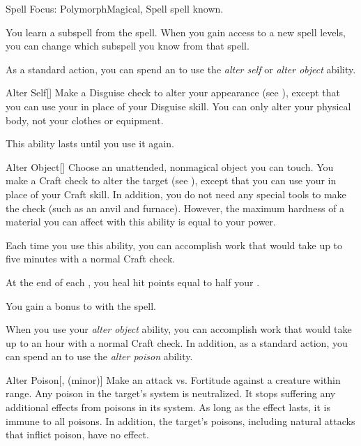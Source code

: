     \begin{feat}{Spell Focus: Polymorph}{Magical, Spell}
        \featpre {} spell known.

         You learn a subspell from the  spell.
        When you gain access to a new spell levels, you can change which subspell you know from that spell.

         As a standard action, you can spend an  to use the \textit{alter self} or \textit{alter object} ability.
        \begin{ability}{Alter Self}[]
            Make a Disguise check to alter your appearance (see ), except that you can use your  in place of your Disguise skill.
            You can only alter your physical body, not your clothes or equipment.

            This ability lasts until you use it again.
        \end{ability}

        \begin{ability}{Alter Object}[]
            Choose an unattended, nonmagical object you can touch.
            You make a Craft check to alter the target (see ), except that you can use your  in place of your Craft skill.
            In addition, you do not need any special tools to make the check (such as an anvil and furnace).
            However, the maximum hardness of a material you can affect with this ability is equal to your power.

            Each time you use this ability, you can accomplish work that would take up to five minutes with a normal Craft check.
        \end{ability}

         At the end of each , you heal hit points equal to half your .

         You gain a  bonus to  with the  spell.

         When you use your \textit{alter object} ability, you can accomplish work that would take up to an hour with a normal Craft check.
        In addition, as a standard action, you can spend an  to use the \textit{alter poison} ability.
        \begin{ability}{Alter Poison}[,  (minor)]
            Make an attack vs. Fortitude against a creature within \rngclose range.
            \hit Any poison in the target's system is neutralized.
            It stops suffering any additional effects from poisons in its system.
            As long as the effect lasts, it is immune to all poisons.
            In addition, the target's  poisons, including natural attacks that inflict poison, have no effect.
        \end{ability}


\end{feat}
